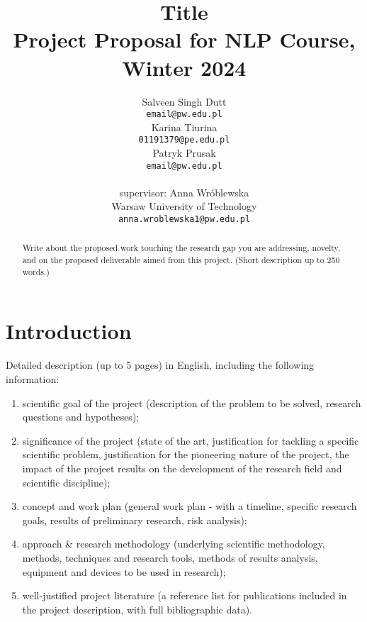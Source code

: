 \documentclass[11pt]{article}
\title{Title\\Project Proposal for NLP Course, Winter 2024}
\author{Salveen Singh Dutt \\
  {\tt email@pw.edu.pl} \\\And
  Karina Tiurina \\
  {\tt 01191379@pe.edu.pl} \\ \And 
  Patryk Prusak \\
  {\tt email@pw.edu.pl} \\ \\ 
  supervisor: Anna Wróblewska\\
  Warsaw University of Technology \\
  {\tt anna.wroblewska1@pw.edu.pl}}
\date{}
\begin{document}
\maketitle
\begin{abstract}
  Write about the proposed work touching the research gap you are addressing, novelty, and on the proposed deliverable aimed from this project.  
  (Short description up to 250 words.)
\end{abstract}

\section{Introduction}
Detailed description (up to 5 pages) in English, including the following information:
\begin{enumerate}
\item scientific goal of the project (description of the problem to be solved, research questions and hypotheses);
\item significance of the project (state of the art, justification for tackling a specific scientific problem, justification for the pioneering nature of the project, the impact of the project results on the development of the research field and scientific discipline);
\item concept and work plan (general work plan - with a timeline, specific research goals, results of preliminary research, risk analysis);
\item approach \& research methodology (underlying scientific methodology, methods, techniques and research tools, methods of results analysis, equipment and devices to be used in research);
\item well-justified project literature (a reference list for publications included in the project description, with full bibliographic data).
\end{enumerate}

%
%
\end{document}
